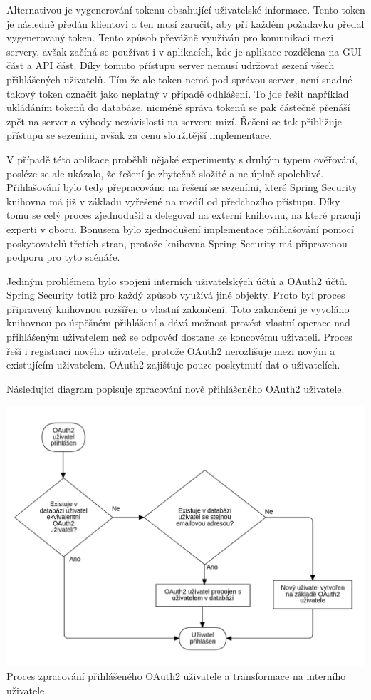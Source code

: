 			Alternativou je vygenerování tokenu obsahující uživatelské informace.
			Tento token je následně předán klientovi a ten musí zaručit, aby při každém požadavku předal vygenerovaný token.
			Tento způsob převážně využíván pro komunikaci mezi servery, avšak začíná se používat i v aplikacích, kde
			je aplikace rozdělena na \ac{GUI} část a \ac{API} část.
			Díky tomuto přístupu server nemusí udržovat sezení všech přihlášených uživatelů.
			Tím že ale token nemá pod správou server, není snadné takový token označit jako neplatný v případě odhlášení.
			To jde řešit například ukládáním tokenů do databáze, nicméně správa tokenů se pak částečně přenáší zpět
			na server a výhody nezávislosti na serveru mizí.
			Řešení se tak přibližuje přístupu se sezeními, avšak za cenu sloužitější implementace.

			V případě této aplikace proběhli nějaké experimenty s druhým typem ověřování, posléze se ale ukázalo, že
			řešení je zbytečně složité a ne úplně spolehlivé.
			Přihlašování bylo tedy přepracováno na řešení se sezeními, které Spring Security knihovna má již v základu
			vyřešené na rozdíl od předchozího přístupu.
			Díky tomu se celý proces zjednodušil a delegoval na externí knihovnu, na které pracují experti v oboru.
			Bonusem bylo zjednodušení implementace přihlašování pomocí poskytovatelů třetích stran, protože
			knihovna Spring Security má připravenou podporu pro tyto scénáře.

			Jediným problémem bylo spojení interních uživatelských účtů a OAuth2 účtů.
			Spring Security totiž pro každý způsob využívá jiné objekty.
			Proto byl proces připravený knihovnou rozšířen o vlastní zakončení.
			Toto zakončení je vyvoláno knihovnou po úspěšném přihlášení a dává možnost provést vlastní operace nad
			přihlášeným uživatelem než se odpověď dostane ke koncovému uživateli.
			Proces řeší i registraci nového uživatele, protože OAuth2 nerozlišuje mezi novým a existujícím uživatelem.
			OAuth2 zajišťuje pouze poskytnutí dat o uživatelích.

			Následující diagram popisuje zpracování nově přihlášeného OAuth2 uživatele.

			\includegraphics{obrazky/proces_prihlaseni_oauth2}\hfill
			Proces zpracování přihlášeného OAuth2 uživatele a transformace na interního uživatele. %

